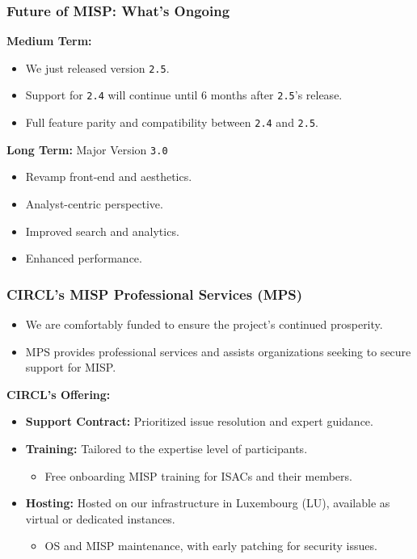 \begin{frame}
    \frametitle{Future of MISP: What's Ongoing}
    \begin{minipage}[t]{0.5\textwidth}
    \textbf{Medium Term:}
    \begin{itemize}
        \item We just released version \texttt{2.5}.
        \item Support for \texttt{2.4} will continue until 6 months after \texttt{2.5}'s release.
        \item Full feature parity and compatibility between \texttt{2.4} and \texttt{2.5}.
    \end{itemize}
    \end{minipage}%
    \begin{minipage}[t]{0.5\textwidth}
    \textbf{Long Term:} Major Version \texttt{3.0}
    \begin{itemize}
        \item Revamp front-end and aesthetics.
        \item Analyst-centric perspective.
        \item Improved search and analytics.
        \item Enhanced performance.
    \end{itemize}
    \end{minipage}%
\end{frame}

\begin{frame}
    \frametitle{CIRCL's MISP Professional Services (MPS)}
    \begin{itemize}
        \item We are comfortably funded to ensure the project's continued prosperity.
        \item MPS provides professional services and assists organizations seeking to secure support for MISP.
    \end{itemize}
    \vspace{1em}
    \textbf{CIRCL's Offering:}
    \begin{itemize}
        \item \textbf{Support Contract:} Prioritized issue resolution and expert guidance.
        \item \textbf{Training:} Tailored to the expertise level of participants.
            \begin{itemize}
                \item {\small Free onboarding MISP training for ISACs and their members.}
            \end{itemize}
        \item \textbf{Hosting:} Hosted on our infrastructure in Luxembourg (LU), available as virtual or dedicated instances.
            \begin{itemize}
                \item {\small OS and MISP maintenance, with early patching for security issues.}
            \end{itemize}
    \end{itemize}
\end{frame}

